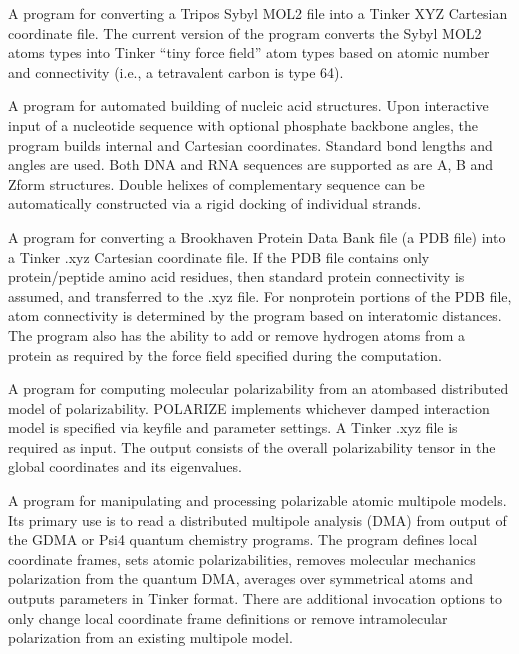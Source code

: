 \documentclass[letterpaper,11pt,english]{sphinxmanual}
\begin{document}

A program for converting a Tripos Sybyl MOL2 file into a Tinker XYZ Cartesian coordinate file. The current version of the program converts the Sybyl MOL2 atoms types into Tinker “tiny force field” atom types based on atomic number and connectivity (i.e., a tetravalent carbon is type 64).


A program for automated building of nucleic acid structures. Upon interactive input of a nucleotide sequence with optional phosphate backbone angles, the program builds internal and Cartesian coordinates. Standard bond lengths and angles are used. Both DNA and RNA sequences are supported as are A\sphinxhyphen{}, B\sphinxhyphen{} and Z\sphinxhyphen{}form structures. Double helixes of complementary sequence can be automatically constructed via a rigid docking of individual strands.


A program for converting a Brookhaven Protein Data Bank file (a PDB file) into a Tinker .xyz Cartesian coordinate file. If the PDB file contains only protein/peptide amino acid residues, then standard protein connectivity is assumed, and transferred to the .xyz file. For non\sphinxhyphen{}protein portions of the PDB file, atom connectivity is determined by the program based on interatomic distances. The program also has the ability to add or remove hydrogen atoms from a protein as required by the force field specified during the computation.


A program for computing molecular polarizability from an atom\sphinxhyphen{}based distributed model of polarizability. POLARIZE implements whichever damped interaction model is specified via keyfile and parameter settings. A Tinker .xyz file is required as input. The output consists of the overall polarizability tensor in the global coordinates and its eigenvalues.


A program for manipulating and processing polarizable atomic multipole models. Its primary use is to read a distributed multipole analysis (DMA) from output of the GDMA or Psi4 quantum chemistry programs. The program defines local coordinate frames, sets atomic polarizabilities, removes molecular mechanics polarization from the quantum DMA, averages over symmetrical atoms and outputs parameters in Tinker format. There are additional invocation options to only change local coordinate frame definitions or remove intramolecular polarization from an existing multipole model.
\end{document}

